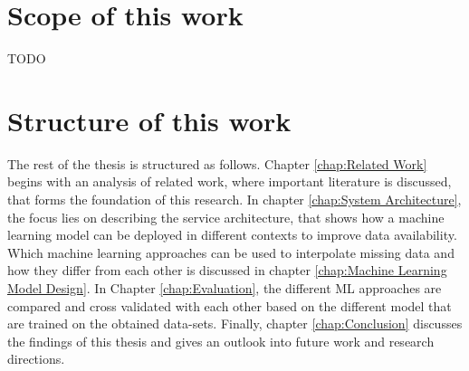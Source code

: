 \section{Scope of this work}
\label{ch:eingrenzungThema}

TODO

\section{Structure of this work} 

The rest of the thesis is structured as follows. Chapter \ref{chap:Related Work} begins with an analysis of related work, where important literature is discussed, that forms the foundation of this research. In chapter \ref{chap:System Architecture}, the focus lies on describing the service architecture, that shows how a machine learning model can be deployed in different contexts to improve data availability. Which machine learning approaches can be used to interpolate missing data and how they differ from each other is discussed in chapter \ref{chap:Machine Learning Model Design}. In Chapter \ref{chap:Evaluation}, the different ML approaches are compared and cross validated with each other based on the different model that are trained on the obtained data-sets. Finally, chapter \ref{chap:Conclusion} discusses the findings of this thesis and gives an outlook into future work and research directions.
